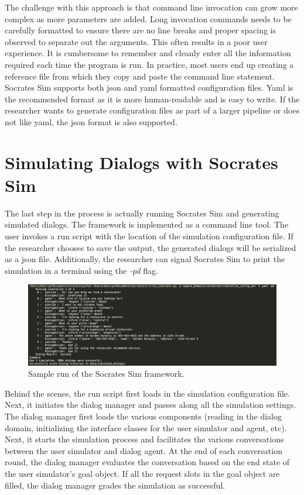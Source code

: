 The challenge with this approach is that command line invocation can grow more complex as more parameters are added. Long invocation commands needs to be carefully formatted to ensure there are no line breaks and proper spacing is observed to separate out the arguments. This often results in a poor user experience. It is cumbersome to remember and cleanly enter all the information required each time the program is run. In practice, most users end up creating a reference file from which they copy and paste the command line statement. Socrates Sim supports both json and yaml formatted configuration files. Yaml is the recommended format as it is more human-readable and is easy to write. If the researcher wants to generate configuration files as part of a larger pipeline or does not like yaml, the json format is also supported. 

\section{Simulating Dialogs with Socrates Sim}

The last step in the process is actually running Socrates Sim and generating simulated dialogs. The framework is implemented as a command line tool. The user invokes a run script with the location of the simulation configuration file. If the researcher chooses to save the output, the generated dialogs will be serialized as a json file. Additionally, the researcher can signal Socrates Sim to print the simulation in a terminal using the \textit{-pd} flag. 

\begin{figure}[h!]
	\centering
	\includegraphics[scale=.15]{diagrams/sample_run.jpeg}
	\caption{ Sample run of the Socrates Sim framework. }
	\label{fig:sample_run}
\end{figure}

Behind the scenes, the run script first loads in the simulation configuration file. Next, it initiates the dialog manager and passes along all the simulation settings. The dialog manager first loads the various components (reading in the dialog domain, initializing the interface classes for the user simulator and agent, etc). Next, it starts the simulation process and facilitates the various conversations between the user simulator and dialog agent. At the end of each conversation round, the dialog manager evaluates the conversation based on the end state of the user simulator's goal object. If all the request slots in the goal object are filled, the dialog manager grades the simulation as successful. 

